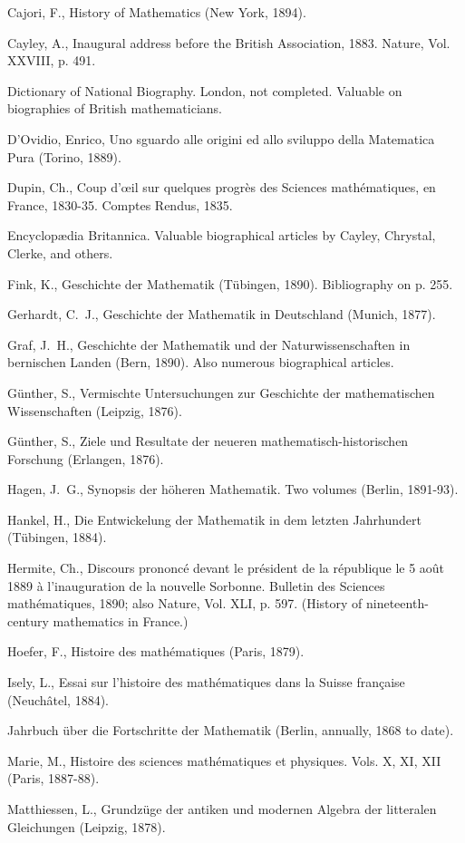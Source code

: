 \documentclass[oneside]{book}
\begin{document}
Cajori, F., History of Mathematics (New York, 1894).

Cayley, A., Inaugural address before the British Association,
1883. Nature, Vol. XXVIII, p. 491.

Dictionary of National Biography. London, not completed. Valuable
on biographies of British mathematicians.

D'Ovidio, Enrico, Uno sguardo alle origini ed allo sviluppo della
Matematica Pura (Torino, 1889).

Dupin, Ch., Coup d'\oe{}il sur quelques progr\`es des Sciences
math\'ematiques, en France, 1830-35. Comptes Rendus, 1835.

Encyclop\ae{}dia Britannica. Valuable biographical articles by Cayley,
Chrystal, Clerke, and others.

Fink, K., Geschichte der Mathematik (T\"ubingen, 1890). Bibliography
on p. 255.

Gerhardt, C.~J., Geschichte der Mathematik in Deutschland (Munich,
1877).

Graf, J.~H., Geschichte der Mathematik und der Naturwissenschaften
in bernischen Landen (Bern, 1890). Also numerous biographical
articles.

G\"unther, S., Vermischte Untersuchungen zur Geschichte der
mathematischen Wissenschaften (Leipzig, 1876).

G\"unther, S., Ziele und Resultate der neueren
mathematisch-historischen Forschung (Erlangen, 1876).

Hagen, J.~G., Synopsis der h\"oheren Mathematik. Two volumes
(Berlin, 1891-93).

Hankel, H., Die Entwickelung der Mathematik in dem letzten
Jahrhundert (T\"ubingen, 1884).

Hermite, Ch., Discours prononc\'e devant le pr\'esident de la
r\'epublique le 5 ao\^ut 1889 \`a l'inauguration de la nouvelle
Sorbonne. Bulletin des Sciences math\'ematiques, 1890; also Nature,
Vol. XLI, p. 597. (History of nineteenth-century mathematics in
France.)

Hoefer, F., Histoire des math\'ematiques (Paris, 1879).

Isely, L., Essai sur l'histoire des math\'ematiques dans la Suisse
fran\c{c}aise (Neuch\^atel, 1884).

Jahrbuch \"uber die Fortschritte der Mathematik (Berlin, annually,
1868 to date).

Marie, M., Histoire des sciences math\'ematiques et physiques.
Vols. X, XI, XII (Paris, 1887-88).

Matthiessen, L., Grundz\"uge der antiken und modernen Algebra der
litteralen Gleichungen (Leipzig, 1878).
\end{document}
